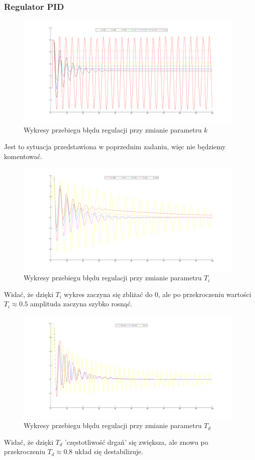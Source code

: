 \documentclass[a4paper,10pt]{article}
\begin{document}
\subsubsection{Regulator PID}
\begin{figure}[!h]
    \centering
	\includegraphics[width=120mm]{CW5-N3C2d1-k03-22.png}
	\caption{Wykresy przebiegu błędu regulacji przy zmianie parametru $k$}
    \label{fig:symulacjaP}
\end{figure}

Jest to sytuacja przedstawiona w poprzednim zadaniu, więc nie będziemy komentować.

\begin{figure}[!h]
    \centering
	\includegraphics[width=120mm]{CW5-N3C2d1-k18-ti005-09.png}
	\caption{Wykresy przebiegu błędu regulacji przy zmianie parametru $T_i$}
    \label{fig:symulacjaP}
\end{figure}

Widać, że dzięki $T_i$ wykres zaczyna się zbliżać do 0, ale po przekroczeniu wartości $T_i \approx 0.5$ amplituda zaczyna szybko rosnąć.

\begin{figure}[!h]
    \centering
	\includegraphics[width=120mm]{CW5-N3C2d1-k18-ti02-td01-1.png}
	\caption{Wykresy przebiegu błędu regulacji przy zmianie parametru $T_d$}
    \label{fig:symulacjaP}
\end{figure}
\newpage
Widać, że dzięki $T_d$ 'częstotliwość drgań' się zwiększa, ale znowu po przekroczeniu $T_d \approx 0.8$ układ się destabilizuje.
\end{document}
